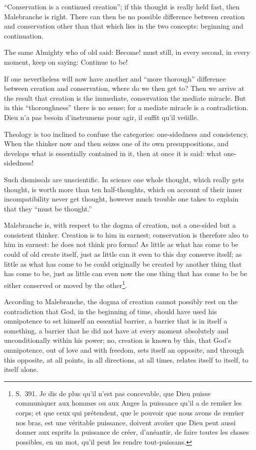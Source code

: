 \documentclass[12pt,a4paper]{article}
\begin{document}
``Conservation is a continued creation''; if this thought is really held fast, then
Malebranche is right. There can then be no possible difference between creation and
conservation other than that which lies in the two concepts: beginning and
continuation.

The same Almighty who of old said: Become! must still, in every second, in every
moment, keep on saying: Continue to be!

If one nevertheless will now have another and ``more thorough'' difference between
creation and conservation, where do we then get to? Then we arrive at the result
that creation is the immediate, conservation the mediate miracle. But in this
``thoroughness'' there is no sense; for a mediate miracle is a contradiction. Dieu
n'a pas besoin d'instrumens pour agir, il suffit qu'il veüille.

Theology is too inclined to confuse the categories: one-sidedness and consistency.
When the thinker now and then seizes one of its own presuppositions, and develops
what is essentially contained in it, then at once it is said: what one-sidedness!

Such dismissals are unscientific. In science one whole thought, which really gets
thought, is worth more than ten half-thoughts, which on account of their inner
incompatibility never get thought, however much trouble one takes to explain that
they ``must be thought.''

Malebranche is, with respect to the dogma of creation, not a one-sided but a
consistent thinker. Creation is to him in earnest; conservation is therefore also
to him in earnest: he does not think pro forma! As little as what has come to be
could of old create itself, just as little can it even to this day conserve itself;
as little as what has come to be could originally be
created by another thing that has come to be, just as little can even now the one
thing that has come to be be either conserved or moved by the other\footnote{S.~391.
Je dis de plus qu'il n'est pas concevable, que Dieu puisse communiquer aux hommes ou
aux Anges la puissance qu'il a de remüer les corps; et que ceux qui prétendent, que
le pouvoir que nous avons de remüer nos bras, est une véritable puissance, doivent
avoüer que Dieu peut aussi donner aux esprits la puissance de créer, d'anéantir, de
faire toutes les choses possibles, en un mot, qu'il peut les rendre tout-puissans.}.

According to Malebranche, the dogma of creation cannot possibly rest on the
contradiction that God, in the beginning of time, should have used his omnipotence
to set himself an essential barrier, a barrier that is in itself a something, a
barrier that he did not have at every moment absolutely and unconditionally within
his power; no, creation is known by this, that God's omnipotence, out of love and
with freedom, sets itself an opposite, and through this opposite, at all points, in
all directions, at all times, relates itself to itself, to itself alone.
\end{document}
